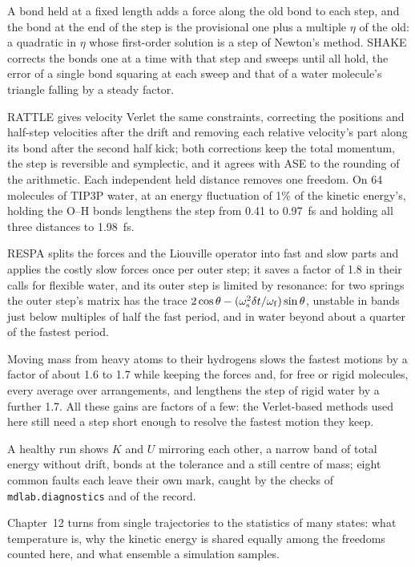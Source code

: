 
A bond held at a fixed length adds a force along the old bond to each
step, and the bond at the end of the step is the provisional one plus a
multiple $\eta$ of the old: a quadratic in $\eta$ whose first-order
solution is a step of Newton's method. SHAKE corrects the bonds one at a
time with that step and sweeps until all hold, the error of a single bond
squaring at each sweep and that of a water molecule's triangle falling by
a steady factor.

RATTLE gives velocity Verlet the same constraints,
correcting the positions and half-step velocities after the drift and
removing each relative velocity's part along its bond after the second
half kick; both corrections keep the total momentum, the step is
reversible and symplectic, and it agrees with ASE to the rounding of the
arithmetic. Each independent held distance removes one freedom. On 64 molecules of
TIP3P water, at an energy fluctuation of 1\% of the kinetic energy's,
holding the O--H bonds lengthens the step from 0.41 to
\SI{0.97}{\femto\second} and holding all three distances to
\SI{1.98}{\femto\second}.

RESPA splits the forces and the Liouville
operator into fast and slow parts and applies the costly slow forces once
per outer step; it saves a factor of 1.8 in their calls for flexible
water, and its outer step is limited by resonance: for two springs the
outer step's matrix has the trace $2\cos\theta - (\omega_{\mathrm s}^2\delta t
/\omega_{\mathrm f})\sin\theta$, unstable in bands just below multiples of
half the fast period, and in water beyond about a quarter of the fastest
period.

Moving mass from heavy atoms to their hydrogens slows the fastest
motions by a factor of about 1.6 to 1.7 while keeping the forces and, for
free or rigid molecules, every average over arrangements, and lengthens
the step of rigid water by a further 1.7. All
these gains are factors of a few: the Verlet-based methods used here
still need a step short enough to resolve the fastest motion they keep.

A healthy run shows $K$
and $U$ mirroring each other, a narrow band of total energy without drift,
bonds at the tolerance and a still centre of mass; eight common faults
each leave their own mark, caught by the checks of
\texttt{mdlab.diagnostics} and of the record.

Chapter~12 turns from single trajectories to the statistics of many
states: what temperature is, why the kinetic energy is shared equally
among the freedoms counted here, and what ensemble a simulation samples.
